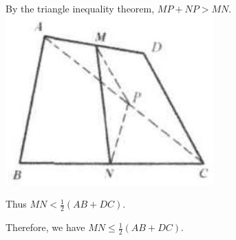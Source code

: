 \documentclass{article}
\begin{document}
By the triangle inequality theorem, \(M P+N P>M N\).\\
\centering
\includegraphics[width=\textwidth]{images/049.jpg}

Thus \(M N<\frac{1}{2}(A B+D C)\).


Therefore, we have \(M N \leq \frac{1}{2}(A B+D C)\).
\end{document}
